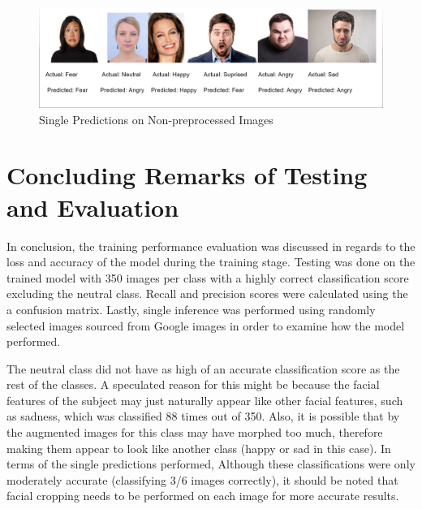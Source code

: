 \begin{figure}[ht]
	\begin{center}
		\advance\leftskip-3cm
		\advance\rightskip-3cm
		\includegraphics[keepaspectratio=true,scale=0.25]{__resources/Testing/inference.png}
		\caption{Single Predictions on Non-preprocessed Images}
		\label{inf}
	\end{center}
\end{figure}


\section{Concluding Remarks of Testing and Evaluation}
In conclusion, the training performance evaluation was discussed in regards to the loss and accuracy of the model during the training stage. Testing was done on the trained model with 350 images per class with a highly correct classification score excluding the neutral class. Recall and precision scores were calculated using the a confusion matrix. Lastly, single inference was performed using randomly selected images sourced from Google images in order to examine how the model performed.

The neutral class did not have as high of an accurate classification score as the rest of the classes. A speculated reason for this might be because the facial features of the subject may just naturally appear like other facial features, such as sadness, which was classified 88 times out of 350. Also, it is possible that by the augmented images for this class may have morphed too much, therefore making them appear to look like another class (happy or sad in this case).
In terms of the single predictions performed, Although these classifications were only moderately accurate (classifying 3/6 images correctly),  it should be noted that facial cropping needs to be performed on each image for more accurate results.


